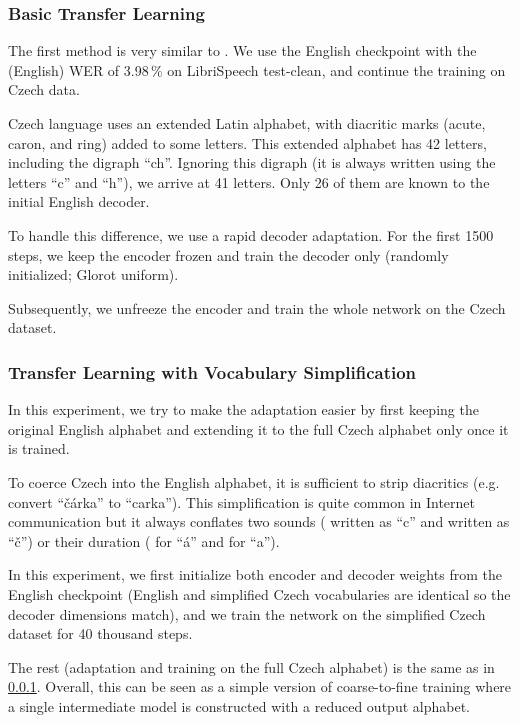 \subsubsection{Basic Transfer Learning}
\label{basic_transfer}

The first method is very similar to . We use the English checkpoint with the (English) WER of 3.98\,\% on LibriSpeech test-clean, and continue the training on Czech data.

Czech language uses an extended Latin alphabet, with diacritic marks (acute, caron, and ring) added to some letters. This extended alphabet has 42 letters, including the digraph ``ch''. Ignoring this digraph (it is always written using the letters ``c'' and ``h''), we arrive at 41 letters. Only 26 of them are known to the initial English decoder.

To handle this difference, we use a rapid decoder adaptation. For the first 1500 steps, we keep the encoder frozen and train the decoder only (randomly initialized; Glorot uniform).

Subsequently, we unfreeze the encoder and train the whole network on the Czech dataset.

\subsubsection{Transfer Learning with Vocabulary Simplification}

In this experiment, we try to make the adaptation easier by first keeping the original English alphabet and extending it to the full Czech alphabet only once it is trained.

To coerce Czech into the English alphabet, it is sufficient to strip diacritics (e.g. convert ``\v{c}\'arka'' to ``carka''). This simplification is quite common in Internet communication but it always conflates two sounds (\textipa{[ts]} written as ``c'' and \textipa{[tS]} written as ``\v{c}'')  or their duration (\textipa{[a:]} for ``\'a'' and \textipa{[a]} for ``a'').

In this experiment, we first initialize both encoder and decoder weights from the English checkpoint (English and simplified Czech vocabularies are identical so the decoder dimensions match), and we train the network on the simplified Czech dataset for 40 thousand steps.

The rest (adaptation and training on the full Czech alphabet)
is the same as in \cref{basic_transfer}.
%
Overall, this can be seen as a simple version of coarse-to-fine training where a single intermediate model is constructed with a reduced output alphabet.

